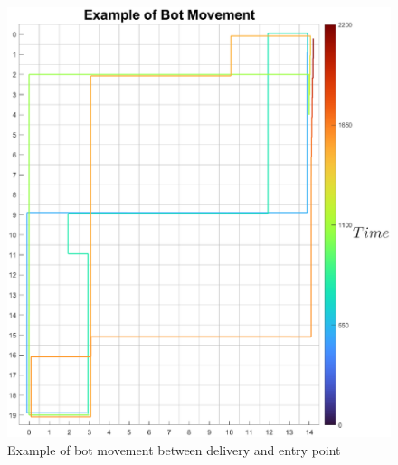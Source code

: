 \documentclass[10pt,a4paper]{article}
\begin{document}
				\begin{figure}[h]
					\centering
					\includegraphics[scale = 0.7]{Images/BotMovement}
					\caption{Example of bot movement between delivery and entry point}
				\end{figure}
		
\end{document}
